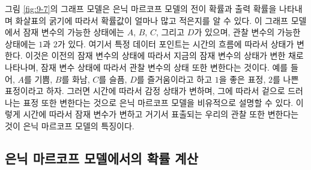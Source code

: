 \documentclass[a4paper]{oblivoir}
\begin{document}
그림 \ref{fig:9-7}의 그래프 모델은 은닉 마르코프 모델의 전이 확률과 출력 확률을 나타내며 화살표의 굵기에 따라서 확률값이 얼마나 많고 적은지를 알 수 있다. 이 그래프 모델에서 잠재 변수의 가능한 상태에는 $A$, $B$, $C$, 그리고 $D$가 있으며, 관찰 변수의 가능한 상태에는 $1$과 $2$가 있다. 여기서 특정 데이터 포인트는 시간의 흐름에 따라서 상태가 변한다. 이것은 이전의 잠재 변수의 상태에 따라서 지금의 잠재 변수의 상태가 변한 채로 나타나며, 잠재 변수 상태에 따라서 관찰 변수의 상태 또한 변한다는 것이다. 예를 들어, $A$를 기쁨, $B$를 화남, $C$를 슬픔, $D$를 즐거움이라고 하고 $1$을 좋은 표정, $2$를 나쁜 표정이라고 하자. 그러면 시간에 따라서 감정 상태가 변하며, 그에 따라서 겉으로 드러나는 표정 또한 변한다는 것으로 은닉 마르코프 모델을 비유적으로 설명할 수 있다. 이렇게 시간에 따라서 잠재 변수가 변하고 거기서 표출되는 우리의 관찰 또한 변한다는 것이 은닉 마르코프 모델의 특징이다. \\

\subsection{은닉 마르코프 모델에서의 확률 계산}
\end{document}
